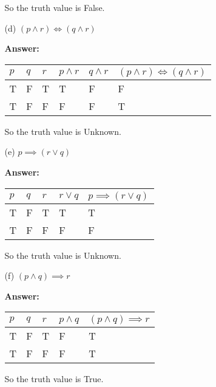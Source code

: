 \documentclass[12pt]{extreport}
\newcommand{\answer}[0]{\medskip \textbf{Answer:} \medskip}
\begin{document}
\begin{enumerate}
\begin{enumerate}
                So the truth value is False.

            \item[(d)] \( (p \land r) \iff (q \land r) \)

                \answer

                \begin{tabular}{|l|l|l|l|l|l|}
                    \hline
                    \( p \) & \( q \) & \( r \) & \( p \land r \) & \( q \land r \) & \( (p \land r) \iff (q \land r) \) \\ \hline
                    T & F & T & T & F & F \\ \hline
                    T & F & F & F & F & T \\ \hline
                \end{tabular}
                
                So the truth value is Unknown.

            \item[(e)] \( p \implies (r \lor q) \)

                \answer

                \begin{tabular}{|l|l|l|l|l|}
                    \hline
                    \( p \) & \( q \) & \( r \) & \( r \lor q \) & \( p \implies (r \lor q) \) \\ \hline
                    T & F & T & T & T \\ \hline
                    T & F & F & F & F \\ \hline
                \end{tabular}

                So the truth value is Unknown.

            \item[(f)] \( (p \land q) \implies r \)
            
                \answer

                \begin{tabular}{|l|l|l|l|l|}
                    \hline
                    \( p \) & \( q \) & \( r \) & \( p \land q \) & \( (p \land q) \implies r \) \\ \hline
                    T & F & T & F & T \\ \hline
                    T & F & F & F & T \\ \hline
                \end{tabular}

                So the truth value is True.

        \end{enumerate}

\end{enumerate}
\newpage
\end{document}
